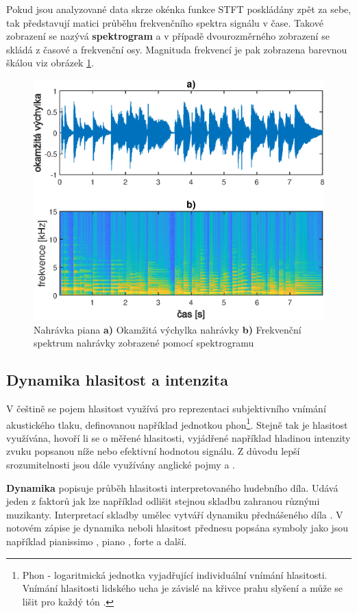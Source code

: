   Pokud jsou analyzované data skrze okénka funkce \acs{STFT} poskládány zpět za sebe, tak představují matici průběhu frekvenčního spektra signálu v čase.
  Takové zobrazení se nazývá \textbf{spektrogram} a v případě dvourozměrného zobrazení se skládá z časové a frekvenční osy.
  Magnituda frekvencí je pak zobrazena barevnou škálou viz obrázek \ref{fig:Spectrogram}.

  \begin{figure}[H]
    \centering
    \includegraphics[width = 0.8\linewidth]{obrazky/Spectrogam.eps}
    \caption{Nahrávka piana \textbf{a)} Okamžitá výchylka nahrávky \textbf{b)} Frekvenční spektrum nahrávky zobrazené pomocí spektrogramu}
    \label{fig:Spectrogram}
  \end{figure}

  \subsection{Dynamika hlasitost a intenzita} \label{sec:Dynamika}
  V češtině se pojem hlasitost využívá pro reprezentaci subjektivního vnímání akustického tlaku, definovanou například jednotkou phon\footnote{Phon - logaritmická jednotka vyjadřující individuální vnímání hlasitosti. Vnímání hlasitosti lidského ucha je závislé na křivce prahu slyšení a může se lišit pro každý tón \cite{tumarkin_1950}.}. 
  Stejně tak je hlasitost využívána, hovoří li se o měřené hlasitosti, vyjádřené například hladinou intenzity zvuku popsanou níže nebo efektivní hodnotou signálu.
  Z důvodu lepší srozumitelnosti jsou dále využívány anglické pojmy  a . 
  
  \textbf{Dynamika} popisuje průběh hlasitosti  interpretovaného hudebního díla. Udává jeden z faktorů jak lze například odlišit stejnou skladbu zahranou různými muzikanty. Interpretací skladby umělec vytváří dynamiku přednášeného díla \cite{fundamental_of_music_processing}.
  V notovém zápise je dynamika neboli hlasitost přednesu popsána symboly jako jsou například pianissimo , piano , forte  a další.

